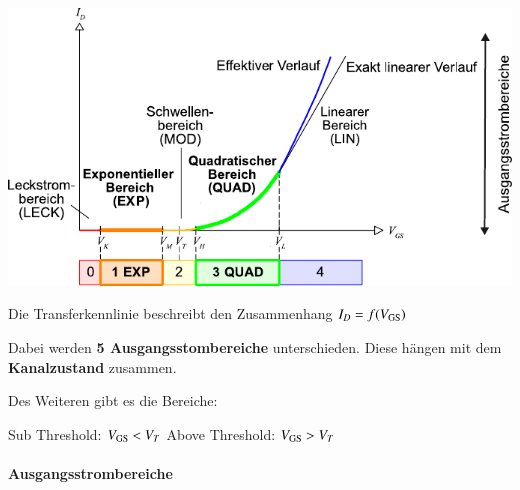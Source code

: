 \begin{minipage}[t]{0.55\columnwidth}
    \includegraphics[width=\columnwidth, align=t]{images/02_MOSFET_transferkennlinie.pdf}
\end{minipage}
\hfill
\begin{minipage}[t]{0.42\columnwidth}
    Die Transferkennlinie beschreibt den Zusammenhang $I_D = f(V_{\rm GS})$ 

    \smallskip

    Dabei werden \textbf{5 Ausgangsstombereiche} unterschieden. Diese hängen mit dem \textbf{Kanalzustand} zusammen.

    \smallskip

    Des Weiteren gibt es die Bereiche:

    \begin{outline}
        \1 Sub Threshold: $V_{\rm GS} < V_T$
        \1 Above Threshold: $V_{\rm GS} > V_T$
    \end{outline}
\end{minipage}


\paragraph{Ausgangsstrombereiche}

